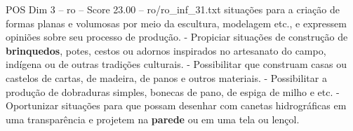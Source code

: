 \begin{textsample}{POS Dim 3 – ro – Score 23.00 – ro/ro\_inf\_31.txt}
situações para a criação de formas planas e volumosas por meio da escultura, modelagem etc., e expressem opiniões sobre seu processo de produção. - Propiciar situações de construção de \textbf{brinquedos}, potes, cestos ou adornos inspirados no artesanato do campo, indígena ou de outras tradições culturais. - Possibilitar que construam casas ou castelos de cartas, de madeira, de panos e outros materiais. - Possibilitar a produção de dobraduras simples, bonecas de pano, de espiga de milho e etc. - Oportunizar situações para que possam desenhar com canetas hidrográficas em uma transparência e projetem na \textbf{parede} ou em uma tela ou lençol.

\end{textsample}
